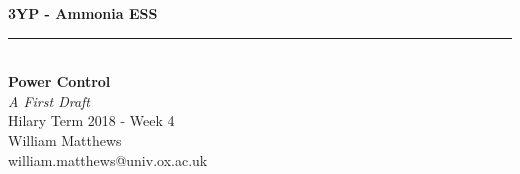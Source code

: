 \begin{titlepage}
        \begin{center}
    \vspace*{1.5cm}
        \Huge
        \textbf{3YP - Ammonia ESS}\\
        \rule{6cm}{1pt}\\   
        \vspace{0.65cm}
        \huge
        \textbf{Power Control}\\
        \LARGE
        \emph{A First Draft}\\
        \normalsize 
        \vspace{1.2cm}
        Hilary Term 2018 - Week 4\\
        \vspace{1cm}
        William Matthews\\
        william.matthews@univ.ox.ac.uk
        \end{center}
\end{titlepage}
